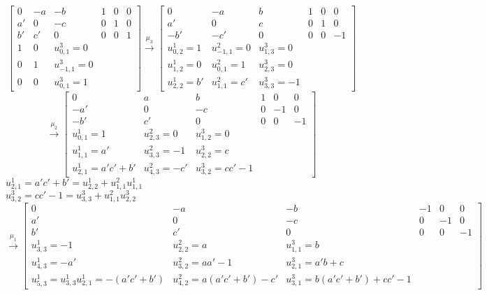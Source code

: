 \documentclass{amsart}
\numberwithin{theorem}{section}
\begin{document}
  \[
    \left[\begin{array}{cccccc} 
      0 & -a & -b & 1 & 0 & 0\\ 
      a' & 0 & -c & 0 & 1 & 0\\ 
      b' & c' & 0 & 0 & 0 & 1\\ 
      1 & 0 & u_{0,1}^3=0\\ 0 & 1 & u_{-1,1}^3=0\\ 0 & 0 & u_{0,1}^3=1
    \end{array}\right]
    \stackrel{\mu_3}{\longrightarrow}
    \left[\begin{array}{cccccc} 
         0 & -a & b & 1 & 0 & 0\\ 
         a' & 0 & c & 0 & 1 & 0\\ 
      -b' & -c' & 0 & 0 & 0 & -1\\ 
      u_{0,2}^1=1 & u_{-1,1}^2=0 & u_{1,3}^3=0\\ u_{1,2}^1=0 & u_{0,1}^2=1 & u_{2,3}^3=0\\ u_{2,2}^1=b' & u_{1,1}^2 = c' & u_{3,3}^3 = -1
    \end{array}\right]
  \]
  \[
    \stackrel{\mu_2}{\longrightarrow}
    \left[\begin{array}{cccccc} 
         0 & a & b & 1 & 0 & 0\\  
      -a' & 0 & -c & 0 & -1 & 0\\  
      -b' & c' & 0 & 0 & 0 & -1\\ 
      u_{0,1}^1=1 & u_{2,3}^2=0 & u_{1,2}^3=0\\ u_{1,1}^1=a' & u_{3,3}^2=-1 & u_{2,2}^3=c\\ u_{2,1}^1=a'c'+b' & u_{4,3}^2 = -c' & u_{3,2}^3=cc'-1
    \end{array}\right]
  \]
  $u_{2,1}^1 = a'c'+b' = u_{2,2}^1 + u_{1,1}^2 u_{1,1}^1$\\
  $u_{3,2}^3 = cc'-1 = u_{3,3}^3 + u_{1,1}^2 u_{2,2}^3$\\
  \[
    \stackrel{\mu_1}{\longrightarrow}
    \left[\begin{array}{cccccc} 
      0 & -a & -b & -1 & 0 & 0\\ 
      a' & 0 & -c & 0 & -1 & 0\\
      b' & c' & 0 & 0 & 0 & -1\\
      u_{3,3}^1=-1 & u_{2,2}^2=a & u_{1,1}^3 = b\\ u_{4,3}^1=-a' & u_{3,2}^2=aa'-1 & u_{2,1}^3 = a'b+c\\ u_{5,3}^1 = u_{3,3}^1 u_{2,1}^1 = -(a'c'+b') & u_{4,2}^2=a(a'c'+b')-c' & u_{3,1}^3=b(a'c'+b')+cc'-1
    \end{array}\right]
  \]
\end{document}
